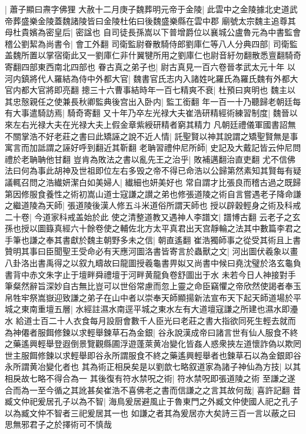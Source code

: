|{
	蕭子顯曰燾字佛狸}
大赦十二月庚子魏葬明元帝于金陵|{
	此雲中之金陵據北史道武帝葬盛樂金陵蓋魏諸陵皆曰金陵杜佑曰後魏盛樂縣在雲中郡}
廟號太宗魏主追尊其母杜貴嬪為密皇后|{
	密諡也}
自司徒長孫嵩以下普增爵位以襄城公盧魯元為中書監會稽公劉絜為尚書令|{
	會工外翻}
司衛監尉眷散騎侍郎劉庫仁等八人分典四部|{
	司衛監盖魏所置以掌宿衛此又一劉庫仁非什翼犍所用之劉庫仁也尉音紆勿翻散悉亶翻騎奇寄翻四部東西南北四部也}
眷古真之弟子也|{
	尉古真見一百六卷晉孝武太元十年}
以河内鎮將代人羅結為侍中外都大官|{
	魏書官氏志内入諸姓叱羅氏為羅氏魏有外都大官内都大官將即亮翻}
摠三十六曹事結時年一百七精爽不衰|{
	杜預曰爽明也}
魏主以其忠慤親任之使兼長秋卿監典後宫出入卧内|{
	監工銜翻}
年一百一十乃聽歸老朝廷每有大事遣騎訪焉|{
	騎奇寄翻}
又十年乃卒左光禄大夫崔浩研精經術練習制度|{
	魏晉以來左右光禄大夫在光禄大夫上假金章紫綬研精者窮其精力}
凡朝廷禮儀軍國書詔無不關掌浩不好老莊之書曰此矯誣之說不近人情|{
	託聖賢以神其說謂之矯聖賢無是事寓言而加詆謂之誣好呼到翻近其靳翻}
老聃習禮仲尼所師|{
	史記及大戴記皆云仲尼問禮於老聃聃他甘翻}
豈肯為敗法之書以亂先王之治乎|{
	敗補邁翻治直吏翻}
尤不信佛法曰何為事此胡神及世祖即位左右多毁之帝不得已命浩以公歸第然素知其賢每有疑議輒召問之浩纎妍潔白如美婦人|{
	纎細也妍美好也}
常自謂才比張良而稽古過之既歸第因修服食養性之術初嵩山道士寇謙之讃之弟也修張道陵之術自言嘗遇老子降命謙之繼道陵為天師|{
	張道陵後漢人修五斗米道俗所謂天師也}
授以辟穀輕身之術及科戒二十卷|{
	今道家科戒盖始於此}
使之清整道教又遇神人李譜文|{
	譜博古翻}
云老子之玄孫也授以圖籙真經六十餘卷使之輔佐北方太平真君出天宫靜輪之法其中數篇李君之手筆也謙之奉其書獻於魏主朝野多未之信|{
	朝直遙翻}
崔浩獨師事之從受其術且上書贊明其事曰臣聞聖王受命必有天應河圖洛書皆寄言於蟲獸之文|{
	河出圖伏羲象以畫八卦洛出書禹得之以叙九疇故曰龍圖授羲龜書畀姒又尚書中候曰堯沈璧於洛玄龜負書背中赤文朱字止于壇畔舜禮壇于河畔黄龍負卷舒圖出于水}
未若今日人神接對手筆粲然辭旨深妙自古無比豈可以世俗常慮而忽上靈之命臣竊懼之帝欣然使謁者奉玉帛牲牢祭嵩嶽迎致謙之弟子在山中者以崇奉天師顯揚新法宣布天下起天師道場於平城之東南重壇五層|{
	水經註濕水南逕平城之東水左有大道壇寇謙之所建也濕水即灅水}
給道士百二十人衣食每月設厨會數千人臣光曰老莊之書大指欲同死生輕去就而為神僊者服餌修鍊以求輕舉鍊草石為金銀|{
	谷永說漢成帝曰諸言世有仙人服食不終之藥遙興輕舉登遐倒景覽觀縣圃浮遊蓬萊黄冶變化皆姦人惑衆挾左道懷詐偽以欺罔世主服餌修鍊以求輕舉即谷永所謂服食不終之藥遙興輕舉者也鍊草石以為金銀即谷永所謂黄冶變化者也}
其為術正相戾矣是以劉歆七略叙道家為諸子神仙為方技|{
	以其相戾故七略不得合為一}
其後復有符水禁呪之術|{
	符水禁呪即張道陵之術}
至謙之遂合而為一至今循之其訛甚矣崔浩不喜佛老之書而信謙之之言其故何哉|{
	喜許記翻}
昔臧文仲祀爰居孔子以為不智|{
	海鳥爰居避風止于魯東門之外臧文仲使國人祀之孔子以為臧文仲不智者三祀爰居其一也}
如謙之者其為爰居亦大矣詩三百一言以蔽之曰思無邪君子之於擇術可不慎哉

